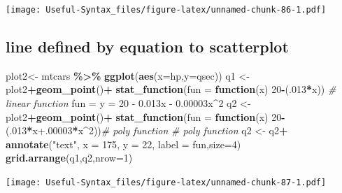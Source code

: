 \documentclass[
]{article}
\newenvironment{Shaded}{\begin{snugshade}}{\end{snugshade}}
\newcommand{\AttributeTok}[1]{\textcolor[rgb]{0.13,0.29,0.53}{#1}}
\newcommand{\CommentTok}[1]{\textcolor[rgb]{0.56,0.35,0.01}{\textit{#1}}}
\newcommand{\ControlFlowTok}[1]{\textcolor[rgb]{0.13,0.29,0.53}{\textbf{#1}}}
\newcommand{\DecValTok}[1]{\textcolor[rgb]{0.00,0.00,0.81}{#1}}
\newcommand{\FloatTok}[1]{\textcolor[rgb]{0.00,0.00,0.81}{#1}}
\newcommand{\FunctionTok}[1]{\textcolor[rgb]{0.13,0.29,0.53}{\textbf{#1}}}
\newcommand{\NormalTok}[1]{#1}
\newcommand{\OtherTok}[1]{\textcolor[rgb]{0.56,0.35,0.01}{#1}}
\newcommand{\SpecialCharTok}[1]{\textcolor[rgb]{0.81,0.36,0.00}{\textbf{#1}}}
\newcommand{\StringTok}[1]{\textcolor[rgb]{0.31,0.60,0.02}{#1}}
\begin{document}
\texttt{[image: Useful-Syntax\_files/figure-latex/unnamed-chunk-86-1.pdf]}

\hypertarget{line-defined-by-equation-to-scatterplot}{%
\subsection{line defined by equation to scatterplot}\label{line-defined-by-equation-to-scatterplot}}

\begin{Shaded}
\begin{Highlighting}[]
\NormalTok{plot2}\OtherTok{\textless{}{-}}\NormalTok{ mtcars }\SpecialCharTok{\%\textgreater{}\%} \FunctionTok{ggplot}\NormalTok{(}\FunctionTok{aes}\NormalTok{(}\AttributeTok{x=}\NormalTok{hp,}\AttributeTok{y=}\NormalTok{qsec))}
\NormalTok{q1 }\OtherTok{\textless{}{-}}\NormalTok{ plot2}\SpecialCharTok{+}\FunctionTok{geom\_point}\NormalTok{()}\SpecialCharTok{+}
    \FunctionTok{stat\_function}\NormalTok{(}\AttributeTok{fun =} \ControlFlowTok{function}\NormalTok{(x) }\DecValTok{20}\SpecialCharTok{{-}}\NormalTok{(.}\DecValTok{013}\SpecialCharTok{*}\NormalTok{x)) }\CommentTok{\# linear function}
\NormalTok{fun }\OtherTok{=} \StringTok{\textquotesingle{}y = 20 {-} 0.013x {-} 0.00003x\^{}2\textquotesingle{}}
\NormalTok{q2 }\OtherTok{\textless{}{-}}\NormalTok{ plot2}\SpecialCharTok{+}\FunctionTok{geom\_point}\NormalTok{()}\SpecialCharTok{+}    \FunctionTok{stat\_function}\NormalTok{(}\AttributeTok{fun =} \ControlFlowTok{function}\NormalTok{(x) }\DecValTok{20}\SpecialCharTok{{-}}\NormalTok{(.}\DecValTok{013}\SpecialCharTok{*}\NormalTok{x}\FloatTok{+.00003}\SpecialCharTok{*}\NormalTok{x}\SpecialCharTok{\^{}}\DecValTok{2}\NormalTok{))}\CommentTok{\# poly function}
 \CommentTok{\# poly function}
\NormalTok{q2 }\OtherTok{\textless{}{-}}\NormalTok{ q2}\SpecialCharTok{+} \FunctionTok{annotate}\NormalTok{(}\StringTok{"text"}\NormalTok{, }\AttributeTok{x =} \DecValTok{175}\NormalTok{, }\AttributeTok{y =} \DecValTok{22}\NormalTok{, }\AttributeTok{label =}\NormalTok{ fun,}\AttributeTok{size=}\DecValTok{4}\NormalTok{)}
\FunctionTok{grid.arrange}\NormalTok{(q1,q2,}\AttributeTok{nrow=}\DecValTok{1}\NormalTok{)}
\end{Highlighting}
\end{Shaded}

\texttt{[image: Useful-Syntax\_files/figure-latex/unnamed-chunk-87-1.pdf]}
\end{document}
